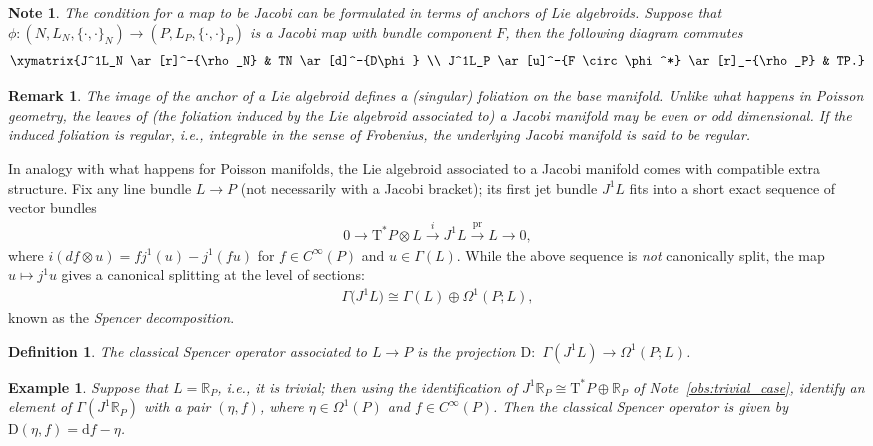 \documentclass[pdftex]{sigma}
\numberwithin{equation}{section}
\newtheorem{Definition}[Theorem]{Definition}
\newtheorem{Note}[Theorem]{Note}
\newtheorem{Example}[Theorem]{Example}
\newtheorem{Remark}[Theorem]{Remark} }
\newcommand{\rmap}{\to}
\newcommand{\de}{\mathrm{d}} %
\newcommand{\cotan}{\mathrm{T}^*} %
\newcommand{\RR}{\mathbb{R}}
\begin{document}
\begin{Note}\label{obs:Jac_maps}
The condition for a map to be Jacobi can be formulated in terms of anchors of Lie algebroids. Suppose that $\phi\colon (N, L_N,\{\cdot,\cdot\}_N) \to (P, L_P, \{\cdot,\cdot\}_P)$ is a Jacobi map with bundle component $F$, then the following diagram commutes
 \begin{gather*}
 \xymatrix{J^1L_N \ar[r]^-{\rho_N} & TN \ar[d]^-{D\phi} \\
 J^1L_P \ar[u]^-{F \circ \phi^*} \ar[r]_-{\rho_P} & TP.}
 \end{gather*}
\end{Note}

\begin{Remark}\label{rk:leaves}
 The image of the anchor of a Lie algebroid def\/ines a (singular) foliation on the base manifold. Unlike what happens in Poisson geometry, the leaves of (the foliation induced by the Lie algebroid associated to) a Jacobi manifold may be even or odd dimensional. If the induced foliation is regular, i.e., integrable in the sense of Frobenius, the underlying Jacobi manifold is said to be {\it regular}.
\end{Remark}

In analogy with what happens for Poisson manifolds, the Lie algebroid associated to a Jacobi manifold comes with compatible extra structure. Fix any line bundle $L \to P$ (not necessarily with a Jacobi bracket); its f\/irst jet bundle $J^1L$ f\/its into a short exact sequence of vector bundles
\begin{gather*}
 0\rmap \cotan P \otimes L \stackrel{i}{\to} J^1L \stackrel{\operatorname{pr}}{\to} L\rmap 0,
\end{gather*}
where $ i(df\otimes u)= f j^1(u)- j^1(fu)$ for $f \in C^{\infty}(P)$ and $u \in \Gamma(L)$. While the above sequence is {\em not} canonically split, the map $u\mapsto j^1u$ gives a canonical splitting at the level of sections:
\begin{gather*} \Gamma\big(J^1L\big)\cong \Gamma(L)\oplus\Omega^1(P;L), \end{gather*}
known as the {\it Spencer decomposition}.

\begin{Definition}\label{defn:cso}
The {\it classical Spencer operator} associated to $L \to P$ is the projection $\mathrm{D}\colon$ $\Gamma(J^1L) \to\Omega^1(P;L)$.
\end{Definition}

\begin{Example}\label{exm:spencer_trivial}
Suppose that $L = \RR_P$, i.e., it is trivial; then using the identif\/ication of $J^1 \RR_P \cong \cotan P \oplus \RR_P$ of Note~\ref{obs:trivial_case}, identify an element of $\Gamma(J^1 \RR_P)$ with a pair $(\eta,f)$, where $\eta \in \Omega^1(P)$ and $f \in C^{\infty}(P)$. Then the classical Spencer operator is given by $\mathrm{D}(\eta,f) = \de f - \eta$.
\end{Example}
\end{document}
